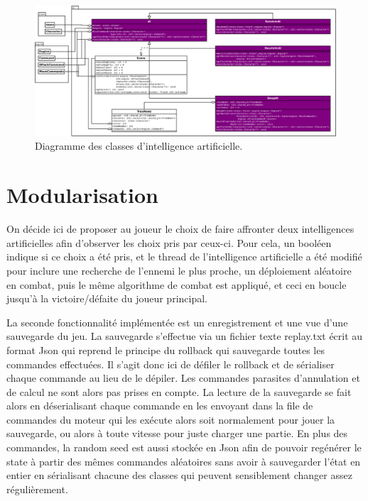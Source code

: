 \documentclass[a4paper,12pt]{article}
\begin{document}
\begin{landscape}
    \begin{figure}[p]
        \centering
        \includegraphics[width=0.9\paperheight,keepaspectratio]{ai.png}
        \caption{\label{uml:ai}Diagramme des classes d'intelligence artificielle.}
    \end{figure}
\end{landscape}


\section{Modularisation}
\label{sec:module}

On décide ici de proposer au joueur le choix de faire affronter deux intelligences artificielles afin d'observer les choix pris par ceux-ci. Pour cela, un booléen indique si ce choix a été pris, et le thread de l'intelligence artificielle a été modifié pour inclure une recherche de l'ennemi le plus proche, un déploiement aléatoire en combat, puis le même algorithme de combat est appliqué, et ceci en boucle jusqu'à la victoire/défaite du joueur principal.

La seconde fonctionnalité implémentée est un enregistrement et une vue d'une sauvegarde du jeu. La sauvegarde s'effectue via un fichier texte replay.txt écrit au format Json qui reprend le principe du rollback qui sauvegarde toutes les commandes effectuées. Il s'agit donc ici de défiler le rollback et de sérialiser chaque commande au lieu de le dépiler. Les commandes parasites d'annulation et de calcul ne sont alors pas prises en compte. La lecture de la sauvegarde se fait alors en déserialisant chaque commande en les envoyant dans la file de commandes du moteur qui les exécute alors soit normalement pour jouer la sauvegarde, ou alors à toute vitesse pour juste charger une partie. En plus des commandes, la random seed est aussi stockée en Json afin de pouvoir regénérer le state à partir des mêmes commandes aléatoires sans avoir à sauvegarder l'état en entier en sérialisant chacune des classes qui peuvent sensiblement changer assez régulièrement.
\end{document}
